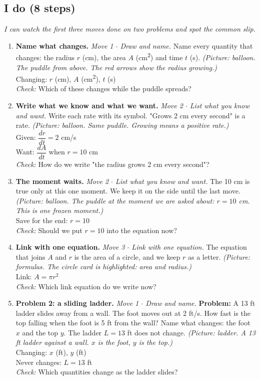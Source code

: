 \documentclass[11pt]{article}
\begin{document}
\subsection*{I do (8 steps)}
\textit{I can watch the first three moves done on two problems and spot the common slip.}\par
\begin{enumerate}
\item \textbf{Name what changes.} \textit{Move 1 $\cdot$ Draw and name.} Name every quantity that changes: the radius $r$ (cm), the area $A$ (cm\textsuperscript{2}) and time $t$ (s). \textit{(Picture: balloon. The puddle from above. The red arrows show the radius growing.)}\\ Changing: $r$ (cm), $A$ (cm\textsuperscript{2}), $t$ (s)\\ \textit{Check:} Which of these changes while the puddle spreads? 
\item \textbf{Write what we know and what we want.} \textit{Move 2 $\cdot$ List what you know and want.} Write each rate with its symbol. "Grows 2 cm every second" is a rate. \textit{(Picture: balloon. Same puddle. Growing means a positive rate.)}\\ Given: $\dfrac{dr}{dt}=2$ cm/s\\ Want: $\dfrac{dA}{dt}$ when $r=10$ cm\\ \textit{Check:} How do we write "the radius grows 2 cm every second"? 
\item \textbf{The moment waits.} \textit{Move 2 $\cdot$ List what you know and want.} The 10 cm is true only at this one moment. We keep it on the side until the last move. \textit{(Picture: balloon. The puddle at the moment we are asked about: $r=10$ cm. This is one frozen moment.)}\\ Save for the end: $r=10$\\ \textit{Check:} Should we put $r=10$ into the equation now? 
\item \textbf{Link with one equation.} \textit{Move 3 $\cdot$ Link with one equation.} The equation that joins $A$ and $r$ is the area of a circle, and we keep $r$ as a letter. \textit{(Picture: formulas. The circle card is highlighted: area and radius.)}\\ Link: $A=\pi r^2$\\ \textit{Check:} Which link equation do we write now? 
\item \textbf{Problem 2: a sliding ladder.} \textit{Move 1 $\cdot$ Draw and name.} \textbf{Problem:} A 13 ft ladder slides away from a wall. The foot moves out at 2 ft/s. How fast is the top falling when the foot is 5 ft from the wall? Name what changes: the foot $x$ and the top $y$. The ladder $L=13$ ft does not change. \textit{(Picture: ladder. A 13 ft ladder against a wall. $x$ is the foot, $y$ is the top.)}\\ Changing: $x$ (ft), $y$ (ft)\\ Never changes: $L=13$ ft\\ \textit{Check:} Which quantities change as the ladder slides? 

\end{enumerate}
\end{document}
